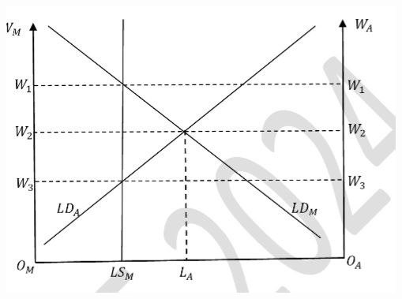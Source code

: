 \documentclass[journal,12pt,onecolumn]{IEEEtran}
\theoremstyle{remark}
\begin{document}
\begin{enumerate}
\includegraphics[scale=0.5]{graph.jpg}


\end{enumerate}
\end{document}
